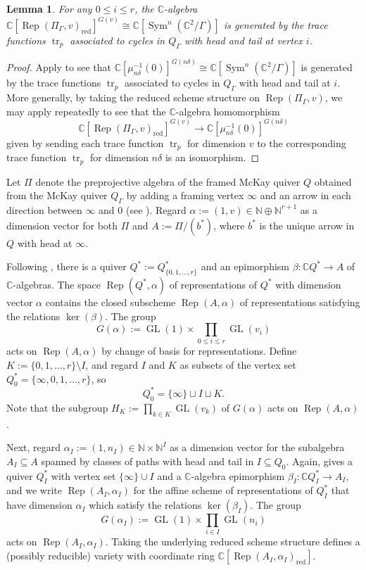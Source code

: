 \documentclass[11pt,reqno]{amsart}
\numberwithin{equation}{section}
\newtheorem{lemma}[theorem]{Lemma}
\theoremstyle{definition}
\newcommand{\CC}{\ensuremath{\mathbb{C}}}
\newcommand{\GL}{\operatorname{GL}}
\newcommand{\Rep}{\operatorname{Rep}}
\newcommand{\Sym}{\operatorname{Sym}}
\newcommand{\tr}{\operatorname{tr}}
\begin{document}
 \begin{lemma}
 \label{lem:RepalphatoSym}
 For any $0\leq i\leq r$, the $\CC$-algebra $\CC[\Rep(\Pi_\Gamma,v)_{\mathrm{red}}]^{G(v)}\cong \CC[\Sym^n(\mathbb{C}^2/\Gamma)]$ is generated by the trace functions $\tr_p$ associated to cycles in $Q_\Gamma$ with head and tail at vertex $i$.
 \end{lemma}
 \begin{proof}
 Apply \cite[Proposition~4.1]{CY23} to see that $\CC[\mu_{n\delta}^{-1}(0)]^{G(n\delta)} \cong \CC[\Sym^n(\mathbb{C}^2/\Gamma)]$ is generated by the trace functions $\tr_p$ associated to cycles in $Q_\Gamma$ with head and tail at $i$. More generally, by taking the reduced scheme structure on $\Rep(\Pi_\Gamma,v)$, we may apply  \cite[Lemma~2.3]{CB02} repeatedly to see that the $\CC$-algebra homomorphism 
 \[
 \CC[\Rep(\Pi_\Gamma,v)_{\mathrm{red}}]^{G(v)}\rightarrow \CC[\mu_{n\delta}^{-1}(0)]^{G(n\delta)}
 \]
 given by sending each trace function $\tr_p$ for dimension $v$ to the corresponding trace function $\tr_p$ for dimension $n\delta$ is an isomorphism.
 \end{proof}
 
 Let $\Pi$ denote the preprojective algebra of the framed McKay quiver $Q$ obtained from the McKay quiver $Q_\Gamma$ by adding a framing vertex $\infty$ and an arrow in each direction between $\infty$ and $0$ (see \cite{CGGS1}).  Regard $\alpha:=(1,v)\in \mathbb{N}\oplus \mathbb{N}^{r+1}$ as a dimension vector for both $\Pi$ and $A:= \Pi/(b^*)$, where $b^*$ is the unique arrow in $Q$ with head at $\infty$. 
 
 Following \cite[Proposition~3.3]{CGGS1}, there is a quiver $Q^*:=Q_{\{0,1,\dots,r\}}^*$ and an epimorphism $\beta\colon \mathbb{C}Q^*\to A$ of $\CC$-algebras. The space $\Rep(Q^*,\alpha)$ of representations of $Q^*$ with dimension vector $\alpha$ contains the closed subscheme $\Rep(A,\alpha)$ of representations satisfying the relations $\ker(\beta)$. The group 
 \[
 G(\alpha):=\GL(1)\times \prod_{0\leq i\leq r} \GL(v_i)
 \]
  acts on $\Rep(A,\alpha)$ by change of basis for representations. Define $K:= \{0,1,\dots, r\}\setminus I$, and regard $I$ and $K$ as subsets of the vertex set $Q_0^*=\{\infty,0,1,\dots, r\}$, so 
  \[
  Q_0^*=\{\infty\}\sqcup I\sqcup K.
  \]
  Note that the subgroup $H_K:= \prod_{k\in K} \GL(v_k)$ of $G(\alpha)$ acts on $\Rep(A,\alpha)$.
 
 Next, regard $\alpha_I:=(1,n_I)\in \mathbb{N}\times \mathbb{N}^I$ as a dimension vector for the subalgebra $A_I\subseteq A$ spanned by classes of paths with head and tail in $I\subseteq Q_0$.  Again, \cite[Proposition~3.3]{CGGS1} gives a quiver $Q_I^*$ with vertex set $\{\infty\}\cup I$ and a $\CC$-algebra epimorphism $\beta_I\colon \mathbb{C}Q_I^*\to A_I$, and we write $\Rep(A_I,\alpha_I)$ for the affine scheme of representations of $Q_I^*$ that have dimension $\alpha_I$ which satisfy the relations $\ker(\beta_I)$. The group 
 \[
 G(\alpha_I):= \GL(1)\times \prod_{i\in I} \GL(n_i)
 \]
 acts on $\Rep(A_I,\alpha_I)$. Taking the underlying reduced scheme structure defines a (possibly reducible) variety with coordinate ring $\CC[\Rep(A_I,\alpha_I)_{
\mathrm{red}}]$.
   
\end{document}
